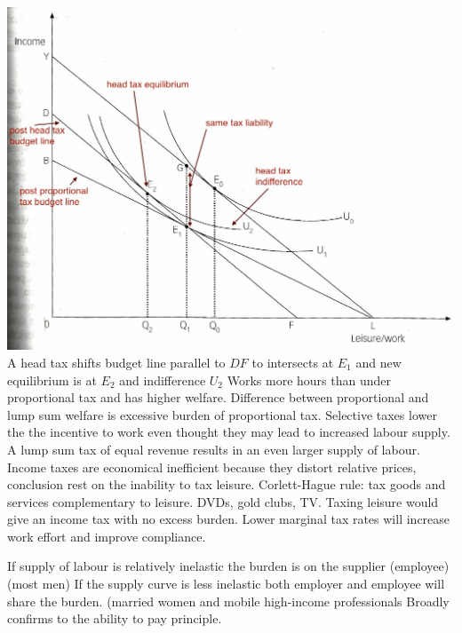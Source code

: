 \documentclass[12pt]{examnotes}
\begin{document}
\includegraphics[scale=0.4]{./imgs/122.jpg}
\ra A head tax shifts budget line parallel to $DF$ to intersects at $E_1$ and new equilibrium is at $E_2$ and indifference $U_2$
\ra Works more hours than under proportional tax and has higher welfare.
\ra Difference between proportional and lump sum welfare is excessive burden of proportional tax.
\ra Selective taxes lower the the incentive to work even thought they may lead to increased labour supply. A lump sum tax of equal revenue results in an even larger supply of labour. 
\ra Income taxes are economical inefficient because they distort relative prices, conclusion rest on the inability to tax leisure.
\ra Corlett-Hague rule: tax goods and services complementary to leisure. DVDs, gold clubs, TV. 
\ra Taxing leisure would give an income tax with no excess burden.
\ra Lower marginal tax rates will increase work effort and improve compliance.

\ra If supply of labour is relatively inelastic the burden is on the supplier (employee) (most men)
\ra If the supply curve is less inelastic both employer and employee will share the burden. (married women and mobile high-income professionals
\ra Broadly confirms to the ability to pay principle.
\end{document}
